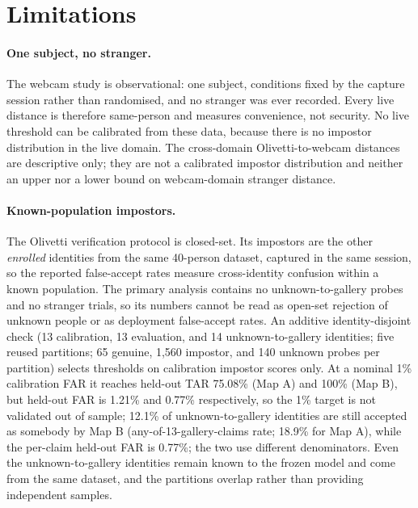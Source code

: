 \section{Limitations}\label{sec:limitations}

\paragraph{One subject, no stranger.} The webcam study is observational: one subject, conditions fixed by the capture session rather than randomised, and no stranger was ever recorded. Every live distance is therefore same-person and measures convenience, not security. No live threshold can be calibrated from these data, because there is no impostor distribution in the live domain. The cross-domain Olivetti-to-webcam distances are descriptive only; they are not a calibrated impostor distribution and neither an upper nor a lower bound on webcam-domain stranger distance.

\paragraph{Known-population impostors.} The Olivetti verification protocol is closed-set. Its impostors are the other \emph{enrolled} identities from the same 40-person dataset, captured in the same session, so the reported false-accept rates measure cross-identity confusion within a known population. The primary analysis contains no unknown-to-gallery probes and no stranger trials, so its numbers cannot be read as open-set rejection of unknown people or as deployment false-accept rates. An additive identity-disjoint check (13 calibration, 13 evaluation, and 14 unknown-to-gallery identities; five reused partitions; 65 genuine, 1,560 impostor, and 140 unknown probes per partition) selects thresholds on calibration impostor scores only. At a nominal 1\% calibration FAR it reaches held-out TAR 75.08\% (Map A) and 100\% (Map B), but held-out FAR is 1.21\% and 0.77\% respectively, so the 1\% target is not validated out of sample; 12.1\% of unknown-to-gallery identities are still accepted as somebody by Map B (any-of-13-gallery-claims rate; 18.9\% for Map A), while the per-claim held-out FAR is 0.77\%; the two use different denominators. Even the unknown-to-gallery identities remain known to the frozen model and come from the same dataset, and the partitions overlap rather than providing independent samples.

